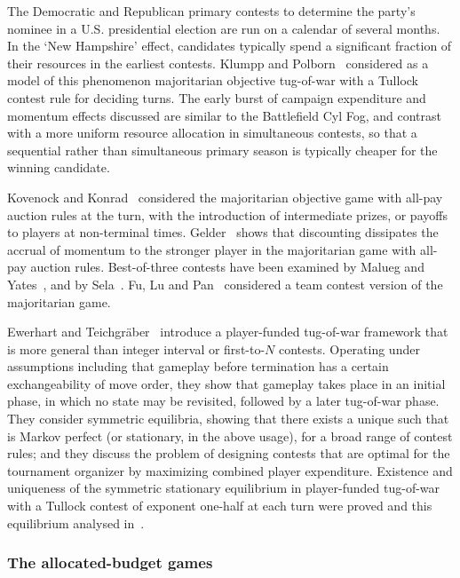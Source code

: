 \documentclass[letterpaper,11pt,oneside,reqno]{amsbook}
\numberwithin{figure}{chapter}
\theoremstyle{definition}
\theoremstyle{definition}
\theoremstyle{definition}
\theoremstyle{definition}
\theoremstyle{definition}
\begin{document}
The Democratic and Republican primary contests to determine the party's nominee in a U.S. presidential election are run on a calendar of several months.
In the `New Hampshire' effect, candidates typically spend a significant fraction of their resources in the earliest contests. Klumpp and Polborn~\cite{KlumppPolborn} considered as a model of this phenomenon majoritarian objective tug-of-war with a Tullock contest rule for deciding turns. The early burst of campaign expenditure and momentum effects discussed are similar to the Battlefield Cyl Fog, and contrast with a more uniform resource allocation in simultaneous contests, so that a sequential rather than simultaneous primary season is typically cheaper for the winning candidate.  

Kovenock and Konrad~\cite{KonradKovenock09} considered the majoritarian objective game with all-pay auction rules at the turn, with the introduction of intermediate prizes, or payoffs to players at non-terminal times. Gelder~\cite{Gelder} shows that discounting dissipates the accrual of momentum to the stronger player in the majoritarian game with all-pay auction rules.
Best-of-three contests have been examined by Malueg and Yates~\cite{MaluegYates}, and by Sela~\cite{Sela}.  Fu, Lu and Pan~\cite{FuLuPan} considered a team contest version of the majoritarian game. 

Ewerhart and Teichgr\"aber~\cite{ET19} introduce a player-funded tug-of-war framework that is more general than integer interval or first-to-$N$ contests. Operating under assumptions including that gameplay before termination has a certain exchangeability of move order, they show that  gameplay takes place in an initial phase, in which no state may be revisited, followed by a later tug-of-war phase. They consider symmetric equilibria, showing that there exists a unique such that is Markov perfect (or stationary, in the above usage), for a broad range of contest rules; and they discuss the problem of designing contests that are optimal for the tournament organizer by maximizing combined player expenditure. 
Existence and uniqueness of the symmetric stationary equilibrium in player-funded tug-of-war with a Tullock contest of exponent one-half at each turn were proved and this equilibrium analysed in~\cite{KST}.

\medskip

\subsubsection{The allocated-budget games}
 
\end{document}
